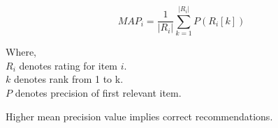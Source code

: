 \begin{equation}
MAP_{i} = \frac{1}{\vert R_{i} \vert} \sum_{k=1}^{\vert R_{i} \vert} { P( R_{i}[k]) }
\label{eq:map_at_k}
\end{equation}

\noindent Where, \\
$R_{i}$ denotes rating for item $i$. \\
$k$ denotes rank from 1 to k.\\
$P$ denotes precision of first relevant item.

\noindent Higher mean precision value implies correct recommendations.
